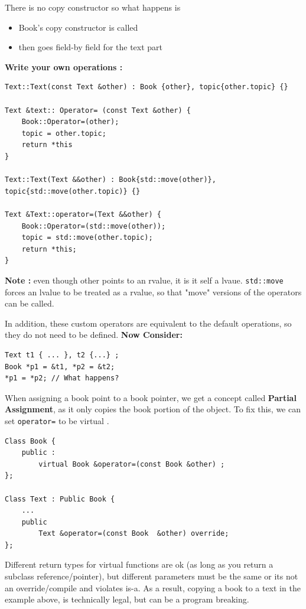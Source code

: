 \documentclass{article}
\begin{document}
There is no copy constructor so what happens is 
\begin{itemize}
\item Book's copy constructor is called 
\item then goes field-by field  for the text part 
\end{itemize}

\textbf{Write your own operations : }
\begin{lstlisting}
Text::Text(const Text &other) : Book {other}, topic{other.topic} {}

Text &text:: Operator= (const Text &other) {
	Book::Operator=(other);
	topic = other.topic;
	return *this 
}

Text::Text(Text &&other) : Book{std::move(other)}, topic{std::move(other.topic)} {}

Text &Text::operator=(Text &&other) {
	Book::Operator=(std::move(other));
	topic = std::move(other.topic);
	return *this;
}

\end{lstlisting}
	
\textbf{Note :} even though other points to an rvalue, it is it self a lvaue. \verb|std::move| forces an lvalue to be treated as a rvalue, so that "move" versions of the operators can be called. 

In addition, these custom operators are equivalent to the default operations, so they do not need to be defined. 
 \newpage
\textbf{Now Consider:}
\begin{lstlisting}
Text t1 { ... }, t2 {...} ;
Book *p1 = &t1, *p2 = &t2;
*p1 = *p2; // What happens?
\end{lstlisting}

When assigning a book point to a book pointer, we get a concept called \textbf{Partial Assignment}, as it only copies the book portion of the object. 
To fix this, we can set \verb|operator=| to be virtual .

\begin{lstlisting}
Class Book {
	public :
		virtual Book &operator=(const Book &other) ;
};

Class Text : Public Book {
	...
	public 
		Text &operator=(const Book  &other) override;
};
\end{lstlisting}

Different return types for virtual functions are ok (as long as you return a subclass reference/pointer), but different parameters must be the same or its not an override/compile and violates is-a. As a result, copying a book to a text in the example above, is technically legal, but can be a program breaking.
\end{document}
